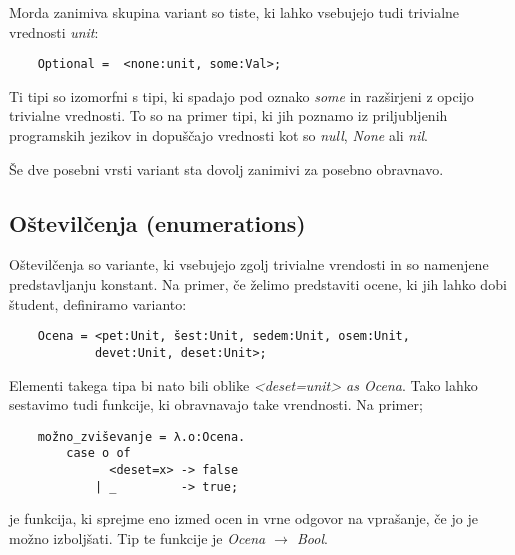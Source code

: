 \documentclass[12pt,a4paper,openany]{book}
\begin{document}
Morda zanimiva skupina variant so tiste, ki lahko vsebujejo tudi trivialne vrednosti \emph{unit}:
\begin{lstlisting}
    Optional =  <none:unit, some:Val>;
\end{lstlisting}
Ti tipi so izomorfni s tipi, ki spadajo pod oznako \emph{some} in razširjeni z opcijo trivialne vrednosti. To so na primer tipi, ki jih poznamo iz priljubljenih programskih jezikov in dopuščajo 
vrednosti kot so \emph{null}, \emph{None} ali \emph{nil}.

Še dve posebni vrsti variant sta dovolj zanimivi za posebno obravnavo.

\subsection{Oštevilčenja (enumerations)}
Oštevilčenja so variante, ki vsebujejo zgolj trivialne vrendosti in so namenjene predstavljanju konstant. Na primer, če želimo predstaviti ocene, ki jih lahko dobi študent, definiramo varianto:
\begin{lstlisting}
    Ocena = <pet:Unit, šest:Unit, sedem:Unit, osem:Unit, 
            devet:Unit, deset:Unit>;
\end{lstlisting}
Elementi takega tipa bi nato bili oblike \emph{<deset=unit> as Ocena}. Tako lahko sestavimo tudi funkcije, ki obravnavajo take vrendnosti. Na primer;
\begin{lstlisting}
    možno_zviševanje = λ.o:Ocena.
        case o of 
              <deset=x> -> false
            | _         -> true;
\end{lstlisting}
je funkcija, ki sprejme eno izmed ocen in vrne odgovor na vprašanje, če jo je možno izboljšati. Tip te funkcije je \emph{Ocena $\rightarrow$ Bool}.
\end{document}
